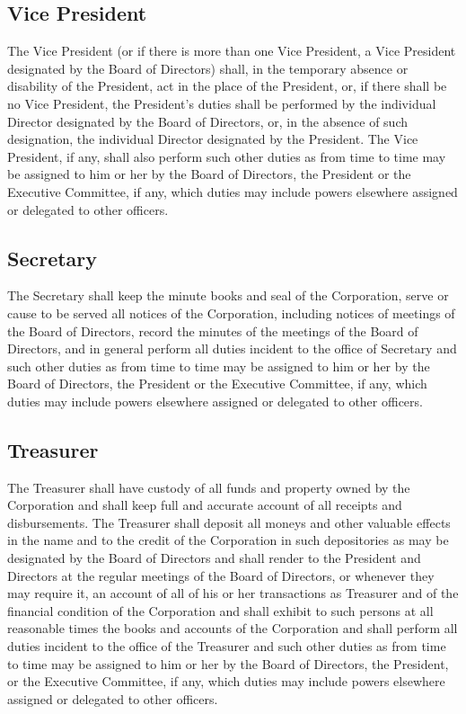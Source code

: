 \documentclass{article}
\begin{document}
\subsection{Vice President}
The Vice President (or if there is more than one Vice President, a Vice President designated by the Board of Directors) shall, in the temporary absence or disability of the President, act in the place of the President, or, if there shall be no Vice President, the President’s duties shall be performed by the individual Director designated by the Board of Directors, or, in the absence of such designation, the individual Director designated by the President.  The Vice President, if any, shall also perform such other duties as from time to time may be assigned to him or her by the Board of Directors, the President or the Executive Committee, if any, which duties may include powers elsewhere assigned or delegated to other officers.
\subsection{Secretary}
The Secretary shall keep the minute books and seal of the Corporation, serve or cause to be served all notices of the Corporation, including notices of meetings of the Board of Directors, record the minutes of the meetings of the Board of Directors, and in general perform all duties incident to the office of Secretary and such other duties as from time to time may be assigned to him or her by the Board of Directors, the President or the Executive Committee, if any, which duties may include powers elsewhere assigned or delegated to other officers.
\subsection{Treasurer}
The Treasurer shall have custody of all funds and property owned by the Corporation and shall keep full and accurate account of all receipts and disbursements.  The Treasurer shall deposit all moneys and other valuable effects in the name and to the credit of the Corporation in such depositories as may be designated by the Board of Directors and shall render to the President and Directors at the regular meetings of the Board of Directors, or whenever they may require it, an account of all of his or her transactions as Treasurer and of the financial condition of the Corporation and shall exhibit to such persons at all reasonable times the books and accounts of the Corporation and shall perform all duties incident to the office of the Treasurer and such other duties as from time to time may be assigned to him or her by the Board of Directors, the President, or the Executive Committee, if any, which duties may include powers elsewhere assigned or delegated to other officers.
\end{document}
